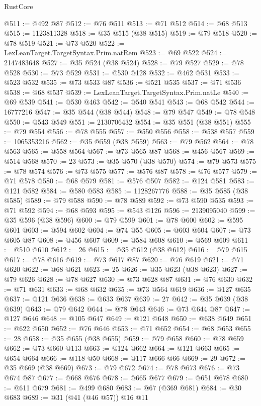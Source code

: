 \begin{lexlean}{RustCore}
\begin{coremodule}
@511 := @492 @87
@512 := @76 @511
@513 := @71 @512
@514 := @68 @513
@515 := 1123811328
@518 := @35 @515 (@38 @515)
@519 := @79 @518
@520 := @78 @519
@521 := @73 @520
@522 := LexLeanTarget.TargetSyntax.Prim.natRem
@523 := @69 @522
@524 := 2147483648
@527 := @35 @524 (@38 @524)
@528 := @79 @527
@529 := @78 @528
@530 := @73 @529
@531 := @530 @128
@532 := @462 @531
@533 := @523 @532
@535 := @73 @533 @87
@536 := @521 @535
@537 := @71 @536
@538 := @68 @537
@539 := LexLeanTarget.TargetSyntax.Prim.natLe
@540 := @69 @539
@541 := @530 @463
@542 := @540 @541
@543 := @68 @542
@544 := 16777216
@547 := @35 @544 (@38 @544)
@548 := @79 @547
@549 := @78 @548
@550 := @543 @549
@551 := 2130706432
@554 := @35 @551 (@38 @551)
@555 := @79 @554
@556 := @78 @555
@557 := @550 @556
@558 := @538 @557
@559 := 1065353216
@562 := @35 @559 (@38 @559)
@563 := @79 @562
@564 := @78 @563
@565 := @558 @564
@567 := @73 @565 @87
@568 := @456 @567
@569 := @514 @568
@570 := 23
@573 := @35 @570 (@38 @570)
@574 := @79 @573
@575 := @78 @574
@576 := @73 @575
@577 := @576 @87
@578 := @76 @577
@579 := @71 @578
@580 := @68 @579
@581 := @576 @507
@582 := @124 @581
@583 := @121 @582
@584 := @580 @583
@585 := 1128267776
@588 := @35 @585 (@38 @585)
@589 := @79 @588
@590 := @78 @589
@592 := @73 @590 @535
@593 := @71 @592
@594 := @68 @593
@595 := @543 @126
@596 := 2139095040
@599 := @35 @596 (@38 @596)
@600 := @79 @599
@601 := @78 @600
@602 := @595 @601
@603 := @594 @602
@604 := @74 @55
@605 := @603 @604
@607 := @73 @605 @87
@608 := @456 @607
@609 := @584 @608
@610 := @569 @609
@611 := @510 @610
@612 := 26
@615 := @35 @612 (@38 @612)
@616 := @79 @615
@617 := @78 @616
@619 := @73 @617 @87
@620 := @76 @619
@621 := @71 @620
@622 := @68 @621
@623 := 25
@626 := @35 @623 (@38 @623)
@627 := @79 @626
@628 := @78 @627
@630 := @73 @628 @87
@631 := @76 @630
@632 := @71 @631
@633 := @68 @632
@635 := @73 @564 @619
@636 := @127 @635
@637 := @121 @636
@638 := @633 @637
@639 := 27
@642 := @35 @639 (@38 @639)
@643 := @79 @642
@644 := @78 @643
@646 := @73 @644 @87
@647 := @127 @646
@648 := @105 @647
@649 := @121 @648
@650 := @638 @649
@651 := @622 @650
@652 := @76 @646
@653 := @71 @652
@654 := @68 @653
@655 := 28
@658 := @35 @655 (@38 @655)
@659 := @79 @658
@660 := @78 @659
@662 := @73 @660 @113
@663 := @124 @662
@664 := @121 @663
@665 := @654 @664
@666 := @118 @50
@668 := @117 @666 @66
@669 := 29
@672 := @35 @669 (@38 @669)
@673 := @79 @672
@674 := @78 @673
@676 := @73 @674 @87
@677 := @668 @676
@678 := @665 @677
@679 := @651 @678
@680 := @611 @679
@681 := @499 @680
@683 := @67 (@369 @681)
@684 := @30 @683
@689 := @31 (@41 (@46 @57)) @16 @11

\end{coremodule}
\end{lexlean}
